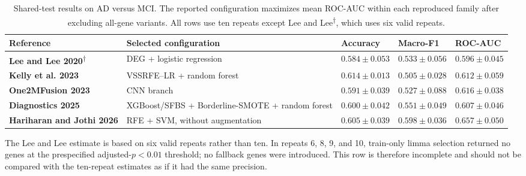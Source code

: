 \begin{table}[htbp]
\centering
\begingroup
\footnotesize
\renewcommand{\arraystretch}{1.35}
\setlength{\tabcolsep}{3.5pt}
\begin{tabularx}{\textwidth}{
    >{\raggedright\arraybackslash}p{}
    >{\raggedright\arraybackslash}X
    >{\centering\arraybackslash}p{}
    >{\centering\arraybackslash}p{}
    >{\centering\arraybackslash}p{}
}
\toprule
\rowcolor{gray!18}
\textbf{Reference} &
\textbf{Selected configuration} &
\textbf{Accuracy} &
\textbf{Macro-F1} &
\textbf{ROC-AUC} \\
\midrule

\textbf{Lee and Lee 2020}\textsuperscript{\(\dagger\)} &
DEG + logistic regression &
\(0.584 \pm 0.053\) &
\(0.533 \pm 0.056\) &
\(0.596 \pm 0.045\) \\

\rowcolor{gray!5}
\textbf{Kelly et al. 2023} &
VSSRFE--LR + random forest &
\(\mathbf{0.614 \pm 0.013}\) &
\(0.505 \pm 0.028\) &
\(0.612 \pm 0.059\) \\

\textbf{One2MFusion 2023} &
CNN branch &
\(0.591 \pm 0.039\) &
\(0.527 \pm 0.088\) &
\(0.616 \pm 0.038\) \\

\rowcolor{gray!5}
\textbf{Diagnostics 2025} &
XGBoost/SFBS + Borderline-SMOTE + random forest &
\(0.600 \pm 0.042\) &
\(0.551 \pm 0.049\) &
\(0.607 \pm 0.046\) \\

\textbf{Hariharan and Jothi 2026} &
RFE + SVM, without augmentation &
\(0.605 \pm 0.039\) &
\(\mathbf{0.598 \pm 0.036}\) &
\(\mathbf{0.657 \pm 0.050}\) \\

\bottomrule
\end{tabularx}
\endgroup
\caption{Shared-test results on AD versus MCI. The reported configuration maximizes mean ROC-AUC within each reproduced family after excluding all-gene variants. All rows use ten repeats except Lee and Lee\textsuperscript{\(\dagger\)}, which uses six valid repeats.}
\label{tab:ad-mci-sota-results}
\end{table}

The Lee and Lee estimate is based on six valid repeats rather than ten. In repeats 6, 8, 9, and 10, train-only limma selection returned no genes at the prespecified adjusted-\(p<0.01\) threshold; no fallback genes were introduced. This row is therefore incomplete and should not be compared with the ten-repeat estimates as if it had the same precision.

